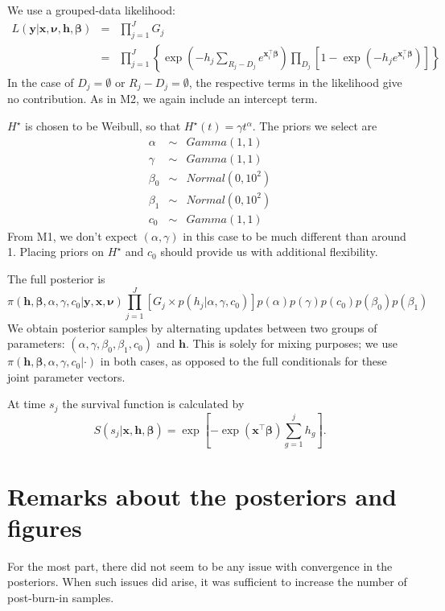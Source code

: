 \documentclass[12pt]{article}
\newcommand{\m}[1]{\mathbf{\bm{#1}}}
\begin{document}
\noindent We use a grouped-data likelihood:
\begin{eqnarray*}
L(\m{y}|\m{x},\m{\nu},\m{h},\m{\beta}) &=& \prod_{j=1}^J G_j \\
&=& \prod_{j=1}^J\left\{\exp\left(-h_j\sum_{R_j-D_j}e^{\m{x}_i^\top\m{\beta}}\right)\prod_{D_j}\left[1-\exp(-h_j e^{\m{x}_i^\top\m{\beta}})\right]\right\}
\end{eqnarray*}
\noindent In the case of $D_j=\emptyset$ or $R_j-D_j=\emptyset$, the respective terms in the likelihood give no contribution. As in M2, we again include an intercept term.
\bigskip

\noindent $H^\star$ is chosen to be Weibull, so that $H^\star(t)=\gamma t^\alpha$. The priors we select are
\begin{eqnarray*}
\alpha  &\sim& Gamma(1, 1) \\
\gamma  &\sim& Gamma(1, 1) \\
\beta_0 &\sim& Normal(0, 10^2) \\
\beta_1 &\sim& Normal(0, 10^2) \\
c_0     &\sim& Gamma(1, 1)
\end{eqnarray*}
\noindent From M1, we don't expect $(\alpha, \gamma)$ in this case to be much different than around 1. Placing priors on $H^\star$ and $c_0$ should provide us with additional flexibility.
\bigskip

\noindent The full posterior is
\[ \pi(\m{h},\m{\beta},\alpha,\gamma,c_0|\m{y},\m{x},\m{\nu}) \prod_{j=1}^J \left[G_j \times p(h_j|\alpha, \gamma, c_0)\right] p(\alpha) p(\gamma) p(c_0) p(\beta_0) p(\beta_1) \]
\noindent We obtain posterior samples by alternating updates between two groups of parameters: $(\alpha,\gamma,\beta_0,\beta_1,c_0)$ and $\m{h}$. This is solely for mixing purposes; we use $\pi(\m{h},\m{\beta},\alpha,\gamma,c_0|\cdot)$ in both cases, as opposed to the full conditionals for these joint parameter vectors.
\bigskip

\noindent At time $s_j$ the survival function is calculated by
\[ S(s_j|\m{x},\m{h},\m{\beta})=\exp\left[-\exp\left(\m{x}^\top\m{\beta}\right)\sum_{g=1}^jh_g\right]. \]

\section*{Remarks about the posteriors and figures}

\noindent For the most part, there did not seem to be any issue with convergence in the posteriors. When such issues did arise, it was sufficient to increase the number of post-burn-in samples.
\bigskip
\end{document}
